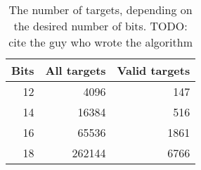\begin{table}
\centering\footnotesize\sf
\begin{tabular}{rrr}
\toprule
Bits & All targets & Valid targets \\
\midrule
12 & 4096   & 147 \\
14 & 16384  & 516 \\
16 & 65536  & 1861 \\
18 & 262144 & 6766 \\
\bottomrule
\end{tabular}
\caption{The number of targets, depending on the desired number of bits. TODO: cite the guy who wrote the algorithm}
\label{tab:markers}
\end{table}
